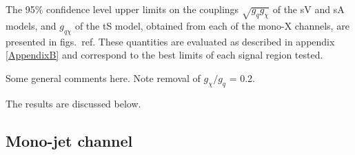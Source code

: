 The 95\% confidence level upper limits on the couplings $\sqrt{g_q g_{\chi}}$ of the sV and sA models, and $g_{q \chi}$ of the tS model, obtained from each of the mono-X channels, are presented in figs.~ref{}. These quantities are evaluated as described in appendix \ref{AppendixB} and correspond to the best limits of each signal region tested.

Some general comments here. Note removal of $g_{\chi} / g_q$ = 0.2.

The results are discussed below.

\subsection{Mono-jet channel}

